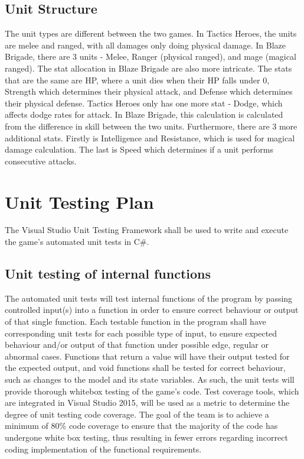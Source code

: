 \documentclass{article}
\begin{document}
\subsection{Unit Structure}
The unit types are different between the two games. In Tactics Heroes, the units are melee and ranged, with all damages only doing physical damage. In Blaze Brigade, there are 3 units - Melee, Ranger (physical ranged), and mage (magical ranged). The stat allocation in Blaze Brigade are also more intricate. The stats that are the same are HP, where a unit dies when their HP falls under 0, Strength which determines their physical attack, and Defense which determines their physical defense. Tactics Heroes only has one more stat - Dodge, which affects dodge rates for attack. In Blaze Brigade, this calculation is calculated from the difference in skill between the two units. Furthermore, there are 3 more additional stats. Firstly is Intelligence and Resistance, which is used for magical damage calculation. The last is Speed which determines if a unit performs consecutive attacks.

\section{Unit Testing Plan}

The Visual Studio Unit Testing Framework shall be used to write and execute the game's automated unit tests in C\#.

\subsection{Unit testing of internal functions}

The automated unit tests will test internal functions of the program by passing controlled input(s) into a function in order to ensure correct behaviour or output of that single function. Each testable function in the program shall have corresponding unit tests for each possible type of input, to ensure expected behaviour and/or output of that function under possible edge, regular or abnormal cases. Functions that return a value will have their output tested for the expected output, and void functions shall be tested for correct behaviour, such as changes to the model and its state variables. As such, the unit tests will provide thorough whitebox testing of the game's code. Test coverage tools, which are integrated in Visual Studio 2015, will be used as a metric to determine the degree of unit testing code coverage. The goal of the team is to achieve a minimum of 80\% code coverage to ensure that the majority of the code has undergone white box testing, thus  resulting in fewer errors regarding incorrect coding implementation of the functional requirements.
\end{document}

